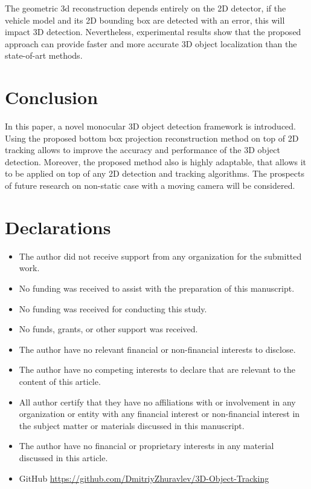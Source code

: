 \documentclass[graybox]{svmult}
\begin{document}

The geometric 3d reconstruction depends entirely on the 2D detector, if the vehicle model and its 2D bounding box are detected with an error, this will impact 3D detection. Nevertheless, experimental results show that the proposed approach can provide faster and more accurate 3D object localization than the state-of-art methods.

\section{Conclusion}
In this paper, a novel monocular 3D object detection framework is introduced.
Using the proposed bottom box projection reconstruction method on top of 2D tracking allows to 
improve the accuracy and performance of the 3D object detection. Moreover, the proposed
method also is highly adaptable, that allows it to be applied on top of any 2D detection and tracking algorithms.
The prospects of future research on non-static case with a moving camera will be considered.



\section{Declarations}
\begin{itemize}
    \item The author did not receive support from any organization for the submitted work.
 \item No funding was received to assist with the preparation of this manuscript.
 \item No funding was received for conducting this study.
 \item No funds, grants, or other support was received. 
 \item  The author have no relevant financial or non-financial interests to disclose.
 \item The author have no competing interests to declare that are relevant to the content of this article.
 \item All author certify that they have no affiliations with or involvement in any organization or entity with any financial interest or non-financial interest in the subject matter or materials discussed in this manuscript.
 \item The author have no financial or proprietary interests in any material discussed in this article.
 \item GitHub \url{https://github.com/DmitriyZhuravlev/3D-Object-Tracking} 
\end{itemize}



\end{document}
